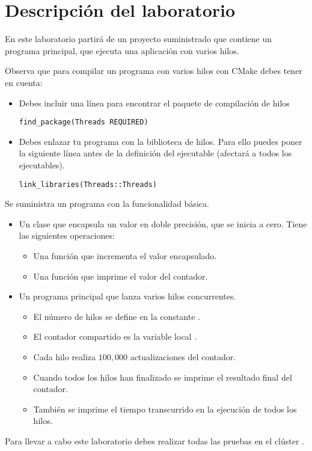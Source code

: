 \section{Descripción del laboratorio}

En este laboratorio partirá de un proyecto suministrado que contiene un programa principal,
que ejecuta una aplicación con varios hilos.

Observa que para compilar un programa con varios hilos con CMake debes tener en cuenta:

\begin{itemize}

\item Debes incluir una línea para encontrar el paquete de compilación de hilos
\begin{lstlisting}
find_package(Threads REQUIRED)
\end{lstlisting}

\item Debes enlazar tu programa con la biblioteca de hilos.
      Para ello puedes poner la siguiente línea antes de la definición del ejecutable
      (afectará a todos los ejecutables).
\begin{lstlisting}
link_libraries(Threads::Threads)
\end{lstlisting}

\end{itemize}

Se suministra un programa  con la funcionalidad básica.

\begin{itemize}

\item Un clase  que encapsula un valor en doble precisión, que se inicia a cero.
      Tiene las siguientes operaciones:
\begin{itemize}
  \item Una función  que incrementa el valor encapsulado.
  \item Una función  que imprime el valor del contador.
\end{itemize}

\item Un programa principal que lanza varios hilos concurrentes.
\begin{itemize}
  \item El número de hilos se define en la constante .
  \item El contador compartido es la variable local .
  \item Cada hilo realiza $100,000$ actualizaciones del contador.
  \item Cuando todos los hilos han finalizado se imprime el resultado final del contador.
  \item También se imprime el tiempo transcurrido en la ejecución de todos los hilos.
\end{itemize}

\end{itemize}


Para llevar a cabo este laboratorio debes realizar todas las pruebas en
el clúster .

